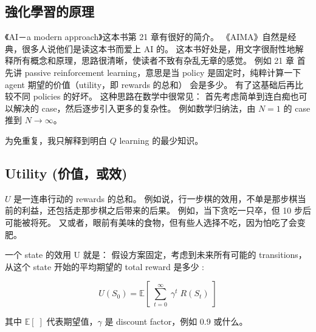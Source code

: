 \documentclass[orivec]{llncs}
\newcommand{\code}[1]{{\footnotesize{\ttfamily #1}}}
\newcommand{\tab}{\hspace*{1cm} }
\begin{document}

\subsection{強化學習的原理}

《AI－a modern approach》这本书第 21 章有很好的简介。  《AIMA》自然是经典，很多人说他们是读这本书而爱上 AI 的。  这本书好处是，用文字很耐性地解释所有概念和原理，思路很清晰，使读者不致有杂乱无章的感觉。  例如 21 章 首先讲 passive reinforcement learning，意思是当 policy 是固定时，纯粹计算一下 agent 期望的价值（utility，即 rewards 的总和） 会是多少。  有了这基础后再比较不同 policies 的好坏。  这种思路在数学中很常见： 首先考虑简单到连白痴也可以解决的 case，然后逐步引入更多的复杂性。  例如数学归纳法，由 $N=1$ 的 case 推到 $N \rightarrow \infty$。

为免重复，我只解释到明白 $Q$ learning 的最少知识。

\subsection{Utility (价值，或效)}

$U$ 是一连串行动的 rewards 的总和。  例如说，行一步棋的效用，不单是那步棋当前的利益，还包括走那步棋之后带来的后果。  例如，当下贪吃一只卒，但 10 步后可能被将死。  又或者，眼前有美味的食物，但有些人选择不吃，因为怕吃了会变肥。

一个 state 的效用 U 就是： 假设方案固定，考虑到未来所有可能的 transitions，从这个 state 开始的平均期望的 total reward 是多少 :

$$ U(S_0) = \mathbb{E}[ \; \sum_{t=0}^{\infty} \; \gamma^t \; R(S_t) \; ] $$

其中 $\mathbb{E[\;]}$ 代表期望值，$\gamma$ 是 discount factor，例如 0.9 或什么。
\end{document}
